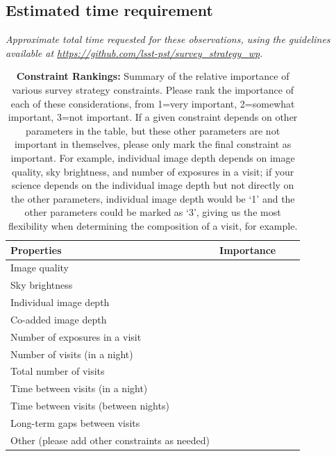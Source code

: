 \documentclass[11pt]{article}
\begin{document}
\subsection{Estimated time requirement}
\begin{footnotesize}
{\it Approximate total time requested for these observations, using the guidelines available at \url{https://github.com/lsst-pst/survey_strategy_wp}.}
\end{footnotesize}

\vspace{.3in}

\begin{table}[ht]
    \centering
    \begin{tabular}{l|l|l|l}
        \toprule
        Properties & Importance \hspace{.3in} \\
        \midrule
        Image quality &     \\
        Sky brightness &  \\
        Individual image depth &   \\
        Co-added image depth &   \\
        Number of exposures in a visit   &   \\
        Number of visits (in a night)  &   \\ 
        Total number of visits &   \\
        Time between visits (in a night) &  \\
        Time between visits (between nights)  &   \\
        Long-term gaps between visits & \\
        Other (please add other constraints as needed) & \\
        \bottomrule
    \end{tabular}
    \caption{{\bf Constraint Rankings:} Summary of the relative importance of various survey strategy constraints. Please rank the importance of each of these considerations, from 1=very important, 2=somewhat important, 3=not important. If a given constraint depends on other parameters in the table, but these other parameters are not important in themselves, please only mark the final constraint as important. For example, individual image depth depends on image quality, sky brightness, and number of exposures in a visit; if your science depends on the individual image depth but not directly on the other parameters, individual image depth would be `1' and the other parameters could be marked as `3', giving us the most flexibility when determining the composition of a visit, for example.}
        \label{tab:obs_constraints}
\end{table}
\end{document}
